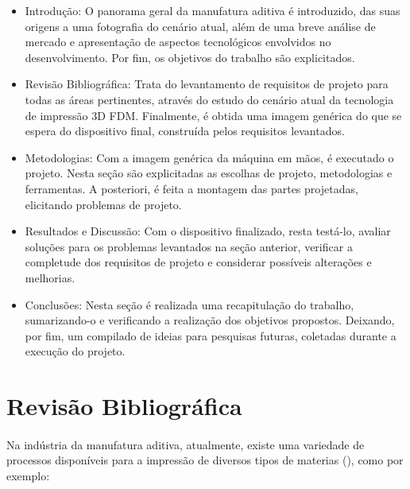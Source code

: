 \documentclass[12pt, english]{article}
\begin{document}
\begin{itemize}
\item Introdução: O panorama geral da manufatura aditiva é introduzido, das suas origens a uma fotografia do cenário atual, além de uma breve análise de mercado e apresentação de aspectos tecnológicos envolvidos no desenvolvimento. Por fim, os objetivos do trabalho são explicitados.
\item Revisão Bibliográfica: Trata do levantamento de requisitos de projeto para todas as áreas pertinentes, através do estudo do cenário atual da tecnologia de impressão 3D FDM. Finalmente, é obtida uma imagem genérica do que se espera do dispositivo final, construída pelos requisitos levantados.
\item Metodologias: Com a imagem genérica da máquina em mãos, é executado o projeto. Nesta seção são explicitadas as escolhas de projeto, metodologias e ferramentas. A posteriori, é feita a montagem das partes projetadas, elicitando problemas de projeto.
\item Resultados e Discussão: Com o dispositivo finalizado, resta testá-lo, avaliar soluções para os problemas levantados na seção anterior, verificar a completude dos requisitos de projeto e considerar possíveis alterações e melhorias.
\item Conclusões: Nesta seção é realizada uma recapitulação do trabalho, sumarizando-o e verificando a realização dos objetivos propostos. Deixando, por fim, um compilado de ideias para pesquisas futuras, coletadas durante a execução do projeto.
\end{itemize}

\pagebreak

\section{Revisão Bibliográfica}

\paragraph{}
Na indústria da manufatura aditiva, atualmente, existe uma variedade de processos disponíveis para a impressão de diversos tipos de materias (\cite{Kafle2021}), como por exemplo:
\end{document}
